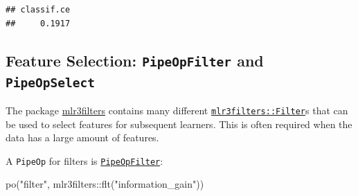 \documentclass[
]{scrbook}
\newenvironment{Shaded}{\begin{snugshade}}{\end{snugshade}}
\newcommand{\DecValTok}[1]{\textcolor[rgb]{0.00,0.00,0.81}{#1}}
\newcommand{\FunctionTok}[1]{\textcolor[rgb]{0.00,0.00,0.00}{#1}}
\newcommand{\NormalTok}[1]{#1}
\newcommand{\OtherTok}[1]{\textcolor[rgb]{0.56,0.35,0.01}{#1}}
\newcommand{\SpecialCharTok}[1]{\textcolor[rgb]{0.00,0.00,0.00}{#1}}
\newcommand{\StringTok}[1]{\textcolor[rgb]{0.31,0.60,0.02}{#1}}
\renewenvironment{Shaded} {\begin{snugshade}\small} {\end{snugshade}}
\begin{document}
\begin{Shaded}
\end{Shaded}

\begin{verbatim}
## classif.ce 
##     0.1917
\end{verbatim}

\hypertarget{feature-selection-pipeopfilter-and-pipeopselect}{%
\subsection{\texorpdfstring{Feature Selection: \texttt{PipeOpFilter} and \texttt{PipeOpSelect}}{Feature Selection: PipeOpFilter and PipeOpSelect}}\label{feature-selection-pipeopfilter-and-pipeopselect}}

The package \href{https://mlr3filters.mlr-org.com}{mlr3filters} contains many different \href{https://mlr3filters.mlr-org.com/reference/Filter.html}{\texttt{mlr3filters::Filter}}s that can be used to select features for subsequent learners.
This is often required when the data has a large amount of features.

A \texttt{PipeOp} for filters is \href{https://mlr3pipelines.mlr-org.com/reference/mlr_pipeops_filter.html}{\texttt{PipeOpFilter}}:

\begin{Shaded}
\begin{Highlighting}[]
\FunctionTok{po}\NormalTok{(}\StringTok{"filter"}\NormalTok{, mlr3filters}\SpecialCharTok{::}\FunctionTok{flt}\NormalTok{(}\StringTok{"information\_gain"}\NormalTok{))}
\end{Highlighting}
\end{Shaded}
\end{document}
